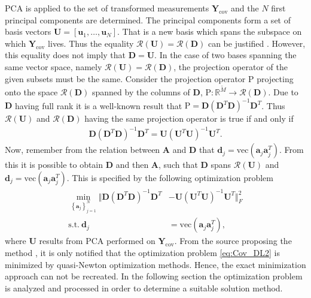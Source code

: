 PCA is applied to the set of transformed measurements $\mathbf{Y}_{\text{cov}}$ and the $N$ first principal components are determined. 
The principal components form a set of basis vectors $\mathbf{U} = [\mathbf{u}_1, \dots, \mathbf{u}_N]$. 
That is a new basis which spans the subspace on which $\mathbf{Y}_{\text{cov}}$ lives. 
Thus the equality $\mathcal{R}(\mathbf{U}) = \mathcal{R}(\mathbf{D})$ can be justified \cite{Balkan2015}. 
However, this equality does not imply that $\mathbf{D} = \mathbf{U}$. 
In the case of two bases spanning the same vector space, namely $\mathcal{R}(\mathbf{U}) = \mathcal{R}(\mathbf{D})$, the projection operator of the given subsets must be the same. 
Consider the projection operator $\text{P}$ projecting onto the space $\mathcal{R}(\mathbf{D})$ spanned by the columns of $\mathbf{D}$, $\text{P}:\mathbb{R}^{\widetilde{M}}\rightarrow \mathcal{R}(\mathbf{D})$. 
Due to $\mathbf{D}$ having full rank it is a well-known result that $\text{P} = \mathbf{D}(\mathbf{D}^T \mathbf{D})^{-1} \mathbf{D}^T$. 
Thus $\mathcal{R}(\mathbf{U})$ and $\mathcal{R}(\mathbf{D})$ having the same projection operator is true if and only if 
\begin{align*}
\mathbf{D} (\mathbf{D}^T\mathbf{D})^{-1} \mathbf{D}^T = \mathbf{U}(\mathbf{U}^T \mathbf{U})^{-1} \mathbf{U}^T.
\end{align*}
Now, remember from the relation between $\mathbf{A}$ and $\mathbf{D}$ that $\mathbf{d}_j = \text{vec}(\mathbf{a}_j \mathbf{a}_j^T)$. 
From this it is possible to obtain $\mathbf{D}$ and then $\mathbf{A}$, such that $\mathbf{D}$ spans $\mathcal{R}(\mathbf{U})$ and $\mathbf{d}_j = \text{vec}(\mathbf{a}_j \mathbf{a}_j^T)$. 
This is specified by the following optimization problem \cite{Balkan2015}
\begin{align}
\min_{\left\{\mathbf{a}_j\right\}_{j = 1}^{N}}\Vert  \mathbf{D}(\mathbf{D}^T \mathbf{D})^{-1} \mathbf{D}^T &- \mathbf{U}(\mathbf{U}^T \mathbf{U})^{-1}\mathbf{U}^T \Vert_{F}^{2} \nonumber \\
\text{s.t.} \ \mathbf{d}_j &= \text{vec}(\mathbf{a}_j \mathbf{a}_j^T),\label{eq:Cov_DL2}
\end{align}      
where $\mathbf{U}$ results from PCA performed on $\mathbf{Y}_{\text{cov}}$.
From the source proposing the method \cite{Balkan2015}, it is only notified that the optimization problem \eqref{eq:Cov_DL2} is minimized by quasi-Newton optimization methods. Hence, the exact minimization approach can not be recreated. 
In the following section the optimization problem is analyzed and processed in order to determine a suitable solution method. 
 

